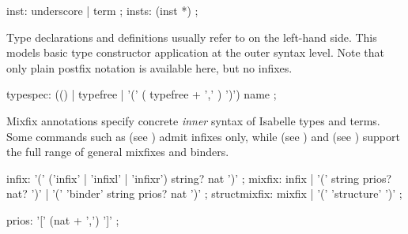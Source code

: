 \begin{isabellebody}
\begin{isamarkuptext}
  \begin{rail}
    inst: underscore | term
    ;
    insts: (inst *)
    ;
  \end{rail}

  Type declarations and definitions usually refer to
   on the left-hand side.  This models basic
  type constructor application at the outer syntax level.  Note that
  only plain postfix notation is available here, but no infixes.

  \begin{rail}
    typespec: (() | typefree | '(' ( typefree + ',' ) ')') name
    ;
  \end{rail}%
\end{isamarkuptext}%
\isamarkuptrue%
%
\isamarkuptrue%
%
\begin{isamarkuptext}%
Mixfix annotations specify concrete \emph{inner} syntax of Isabelle
  types and terms.  Some commands such as \mbox{} (see
  ) admit infixes only, while \mbox{} (see ) and \mbox{} (see
  ) support the full range of general mixfixes
  and binders.

  \begin{rail}
    infix: '(' ('infix' | 'infixl' | 'infixr') string? nat ')'
    ;
    mixfix: infix | '(' string prios? nat? ')' | '(' 'binder' string prios? nat ')'
    ;
    structmixfix: mixfix | '(' 'structure' ')'
    ;

    prios: '[' (nat + ',') ']'
    ;
  \end{rail}


\end{isamarkuptext}
\end{isabellebody}
